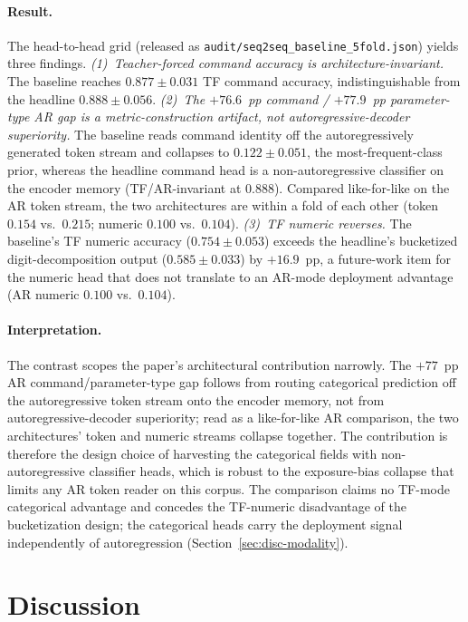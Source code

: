 \documentclass[sensors,article,submit,moreauthors,pdftex]{Definitions/mdpi}
\begin{document}
\paragraph{Result.} The head-to-head grid (released as \texttt{audit/seq2seq\_baseline\_5fold.json}) yields three findings. \emph{(1)~Teacher-forced command accuracy is architecture-invariant.} The baseline reaches $0.877 \pm 0.031$ TF command accuracy, indistinguishable from the headline $0.888 \pm 0.056$. \emph{(2)~The $+76.6$~pp command / $+77.9$~pp parameter-type AR gap is a metric-construction artifact, not autoregressive-decoder superiority.} The baseline reads command identity off the autoregressively generated token stream and collapses to $0.122 \pm 0.051$, the most-frequent-class prior, whereas the headline command head is a non-autoregressive classifier on the encoder memory (TF/AR-invariant at $0.888$). Compared like-for-like on the AR token stream, the two architectures are within a fold of each other (token $0.154$ vs.\ $0.215$; numeric $0.100$ vs.\ $0.104$). \emph{(3)~TF numeric reverses.} The baseline's TF numeric accuracy ($0.754 \pm 0.053$) exceeds the headline's bucketized digit-decomposition output ($0.585 \pm 0.033$) by $+16.9$~pp, a future-work item for the numeric head that does not translate to an AR-mode deployment advantage (AR numeric $0.100$ vs.\ $0.104$).

\paragraph{Interpretation.} The contrast scopes the paper's architectural contribution narrowly. The $+77$~pp AR command/parameter-type gap follows from routing categorical prediction off the autoregressive token stream onto the encoder memory, not from autoregressive-decoder superiority; read as a like-for-like AR comparison, the two architectures' token and numeric streams collapse together. The contribution is therefore the design choice of harvesting the categorical fields with non-autoregressive classifier heads, which is robust to the exposure-bias collapse that limits any AR token reader on this corpus. The comparison claims no TF-mode categorical advantage and concedes the TF-numeric disadvantage of the bucketization design; the categorical heads carry the deployment signal independently of autoregression (Section~\ref{sec:disc-modality}).

\section{Discussion}
\label{sec:discussion}
\end{document}
